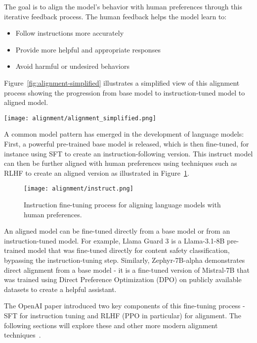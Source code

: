 The goal is to align the model's behavior with human preferences through this iterative feedback process. The human feedback helps the model learn to:
\begin{itemize}
\item Follow instructions more accurately
\item Provide more helpful and appropriate responses  
\item Avoid harmful or undesired behaviors
\end{itemize}

Figure~\ref{fig:alignment-simplified} illustrates a simplified view of this alignment process showing the progression from base model to instruction-tuned model to aligned model.

\begin{figure*}
\centering
\texttt{[image: alignment/alignment\_simplified.png]}
\caption{Simplified view of the alignment process showing the progression from base model to instruction-tuned model to aligned model \cite{ouyang2022traininglanguagemodelsfollow}.}
\label{fig:alignment-simplified}
\end{figure*}

A common model pattern has emerged in the development of language models: First, a powerful pre-trained base model is released, which is then fine-tuned, for instance using SFT to create an instruction-following version. This instruct model can then be further aligned with human preferences using techniques such as RLHF to create an aligned version as illustrated in Figure~\ref{fig:instruct}.

\begin{figure}[H]
\centering
\texttt{[image: alignment/instruct.png]}
\caption{Instruction fine-tuning process for aligning language models with human preferences.}
\label{fig:instruct}
\end{figure}

An aligned model can be fine-tuned directly from a base model or from an instruction-tuned model. For example, Llama Guard 3  is a Llama-3.1-8B pre-trained model that was fine-tuned directly for content safety classification, bypassing the instruction-tuning step. Similarly, Zephyr-7B-alpha  demonstrates direct alignment from a base model - it is a fine-tuned version of Mistral-7B that was trained using Direct Preference Optimization (DPO) on publicly available datasets to create a helpful assistant.

The OpenAI paper introduced two key components of this fine-tuning process - SFT for instruction tuning and RLHF (PPO in particular) for alignment. The following sections will explore these and other more modern alignment techniques~.



